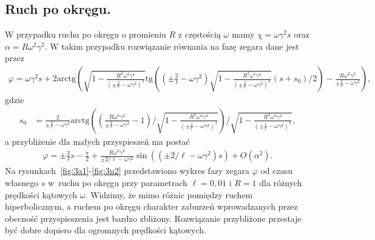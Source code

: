 \subsection{Ruch po okręgu.}
W przypadku ruchu po okręgu o promieniu $R$ z 
częstością $\omega$ mamy
$\chi = \omega \gamma^2 s$ oraz 
$\alpha = R\omega^2\gamma^2 $.
W takim przypadku rozwiązanie równania na fazę zegara dane jest przez
\begin{align}\nonumber
\varphi = \omega\gamma^2 s +  
2\text{arctg} \left( 
\sqrt{ 1-\frac{R^2\omega^4\gamma^4}{\left( \pm \frac{2}{\ell} 
-\omega\gamma^2 \right)^2 } }
\text{tg} \left( 
\left( \pm \frac{2}{\ell} -\omega\gamma^2 \right)
\sqrt{ 1-\frac{R^2\omega^4\gamma^4}{\left( \pm \frac{2}{\ell} 
-\omega\gamma^2 \right)^2 } }(s + s_0)/2
\right)  
- \frac{R \omega^2 \gamma^2}{\pm \frac{2}{\ell} -\omega\gamma^2}
\right),
\end{align}
gdzie
\begin{align*}
s_0 & = \frac{2}{\pm \frac{2}{\ell} -\omega\gamma^2} 
\text{arctg}  
\left( \left( \frac{R \omega^2 \gamma^2}{\pm \frac{2}{\ell} 
-\omega\gamma^2} - 1 \right) \Big /  
\sqrt{ 1-\frac{R^2\omega^4\gamma^4}{\left( \pm \frac{2}{\ell} 
-\omega\gamma^2 \right)^2 } }
\right)\Big /   
\sqrt{ 1-\frac{R^2\omega^4\gamma^4}{\left( \pm \frac{2}{\ell} 
-\omega\gamma^2 \right)^2 } } ,
\end{align*}
a przybliżenie dla małych przyspieszeń ma postać 
\begin{align}\nonumber
\varphi =  \pm \frac{2}{\ell}s - \frac{\pi}{2} 
+
\frac{R \omega^2 \gamma^2}{\pm 2/\ell - \omega\gamma^2}
\sin ( (\pm 2/\ell - \omega\gamma^2) s )  
+O(\alpha^2).
\end{align}
Na rysunkach~\ref{fig:3a1}-\ref{fig:3n2} przedstawiono 
wykres fazy zegara $\varphi$ od czasu własnego $s$ 
w~ruchu po okręgu przy parametrach
$\ell=0,01$ i $R=1$ dla różnych prędkości kątowych $\omega$. 
Widzimy, że mimo różnic pomiędzy ruchem hiperbolicznym, a 
ruchem po okręgu charakter zaburzeń wprowadzanych przez 
obecność przyspieszenia jest bardzo zbliżony.
Rozwiązanie przybliżone przestaje być dobre dopiero dla 
ogromnych prędkości kątowych.
